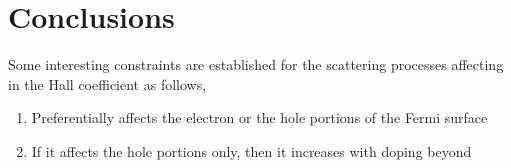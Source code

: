 
\section{Conclusions}

Some interesting constraints are established for the scattering processes affecting in the Hall coefficient as follows,

\begin{enumerate}
    \item Preferentially affects the electron or the hole portions of the Fermi surface
    \item If it affects the hole portions only, then it increases with doping beyond 
\end{enumerate}
